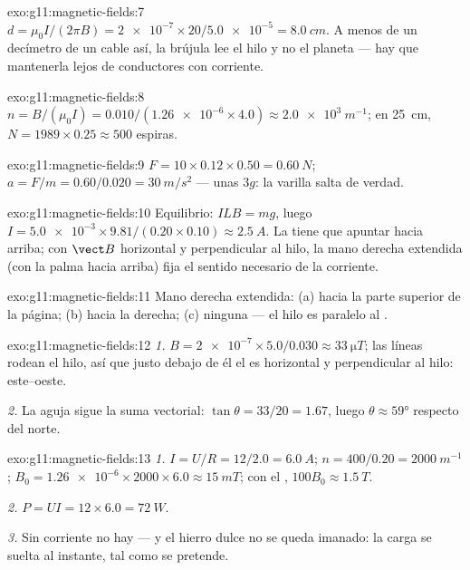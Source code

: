 \begin{solution}{exo:g11:magnetic-fields:7}
$d = \mu_0 I / (2\pi B) = \num{2e-7} \times 20 / \num{5.0e-5}
= \qty{8.0}{cm}$. A menos de un decímetro de un cable así, la brújula
lee el hilo y no el planeta --- hay que mantenerla lejos de conductores
con corriente.
\end{solution}

\begin{solution}{exo:g11:magnetic-fields:8}
$n = B/(\mu_0 I) = 0.010 / (\num{1.26e-6} \times 4.0)
\approx \qty{2.0e3}{m^{-1}}$; en \qty{25}{cm},
$N = 1989 \times 0.25 \approx 500$ espiras.
\end{solution}

\begin{solution}{exo:g11:magnetic-fields:9}
$F = 10 \times 0.12 \times 0.50 = \qty{0.60}{N}$;
$a = F/m = 0.60/0.020 = \qty{30}{m/s^2}$ --- unas $3g$: la varilla salta
de verdad.
\end{solution}

\begin{solution}{exo:g11:magnetic-fields:10}
Equilibrio: $ILB = mg$, luego
$I = \num{5.0e-3} \times 9.81 / (0.20 \times 0.10) \approx
\qty{2.5}{A}$. La  tiene que apuntar hacia arriba; con $\vect B$
horizontal y perpendicular al hilo, la mano derecha extendida (con la
palma hacia arriba) fija el sentido necesario de la corriente.
\end{solution}

\begin{solution}{exo:g11:magnetic-fields:11}
Mano derecha extendida: (a) hacia la parte superior de la página; (b)
hacia la derecha; (c) ninguna  --- el hilo es paralelo al .
\end{solution}

\begin{solution}{exo:g11:magnetic-fields:12}
\emph{1.} $B = \num{2e-7} \times 5.0 / 0.030 \approx
\qty{33}{\micro T}$; las líneas rodean el hilo, así que justo debajo de
él el  es horizontal y perpendicular al hilo: este--oeste.

\emph{2.} La aguja sigue la suma vectorial:
$\tan\theta = 33/20 = 1.67$, luego $\theta \approx \ang{59}$ respecto
del norte.
\end{solution}

\begin{solution}{exo:g11:magnetic-fields:13}
\emph{1.} $I = U/R = 12/2.0 = \qty{6.0}{A}$;
$n = 400/0.20 = \qty{2000}{m^{-1}}$;
$B_0 = \num{1.26e-6} \times 2000 \times 6.0 \approx \qty{15}{mT}$; con
el , $100 B_0 \approx \qty{1.5}{T}$.

\emph{2.} $P = UI = 12 \times 6.0 = \qty{72}{W}$.

\emph{3.} Sin corriente no hay  --- y el hierro dulce no se queda
imanado: la carga se suelta al instante, tal como se pretende.
\end{solution}

